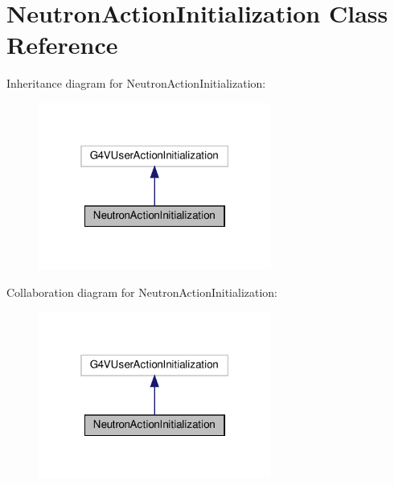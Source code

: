 \hypertarget{classNeutronActionInitialization}{}\section{Neutron\+Action\+Initialization Class Reference}
\label{classNeutronActionInitialization}


Inheritance diagram for Neutron\+Action\+Initialization\+:
\nopagebreak
\begin{figure}[H]
\begin{center}
\leavevmode
\includegraphics[width=217pt]{classNeutronActionInitialization__inherit__graph}
\end{center}
\end{figure}


Collaboration diagram for Neutron\+Action\+Initialization\+:
\nopagebreak
\begin{figure}[H]
\begin{center}
\leavevmode
\includegraphics[width=217pt]{classNeutronActionInitialization__coll__graph}
\end{center}
\end{figure}
